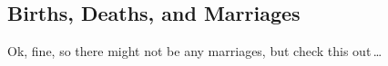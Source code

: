 \documentclass[11pt]{article}
\newcommand{\myheading}[1]
{{\noindent\Large #1}

}
\renewcommand{\myheading}[1]{\subsection{#1}}
\begin{document}
%
%
%
%
%
%
%
\myheading{Births, Deaths, and Marriages}%
Ok, fine, so there might not be any marriages, but check this out\,\ldots
\end{document}
